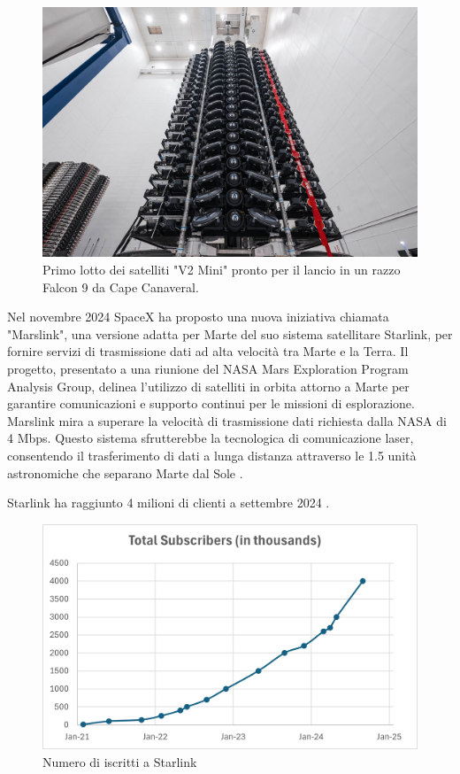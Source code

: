 \begin{figure}[htbp]
  \centering
  \includegraphics[width=0.7\linewidth]{./res/img/satellite_v2mini.jpg}
  \caption{Primo lotto dei satelliti "V2 Mini" pronto per il lancio in un razzo Falcon 9 da Cape Canaveral.}
  \label{fig:satellite_v2mini}
\end{figure}

Nel novembre 2024 SpaceX ha proposto una nuova iniziativa chiamata "Marslink", una versione adatta per Marte del suo sistema satellitare Starlink, per fornire servizi di trasmissione dati ad alta velocità tra Marte e la Terra. 
Il progetto, presentato a una riunione del NASA Mars Exploration Program Analysis Group, delinea l'utilizzo di satelliti in orbita attorno a Marte per garantire comunicazioni e supporto continui per le missioni di esplorazione.
Marslink mira a superare la velocità di trasmissione dati richiesta dalla NASA di 4 Mbps.
Questo sistema sfrutterebbe la tecnologica di comunicazione laser, consentendo il trasferimento di dati a lunga distanza attraverso le 1.5 unità astronomiche che separano Marte dal Sole \cite{michael_kan_spacex_2024}.

Starlink ha raggiunto 4 milioni di clienti a settembre 2024 \cite{starlink_starlink_nodate}.

\begin{figure}[htbp]
  \centering
  \includegraphics[width=0.7\linewidth]{./res/img/chart_subs.png}
  \caption{Numero di iscritti a Starlink}
  \label{fig:chart-subs}
\end{figure}

